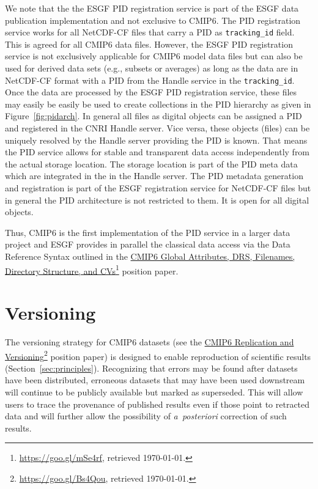 \documentclass[gmd,manuscript]{copernicus}
\newcommand{\pllabel}[1]{\label{p-#1}\linelabel{l-#1}}
\newcommand{\urlref}[2] {\href{#1}{#2}\footnote{\url{#1}, retrieved \today.}}
\begin{document}
\pllabel{RC1-57}
We note that the the ESGF PID registration service is part of the ESGF
data publication implementation and not exclusive to CMIP6. The PID
registration service works for all NetCDF-CF files that carry a PID
as \texttt{tracking\_id} field. This is agreed for all CMIP6 data
files. However, the ESGF PID registration service is not exclusively
applicable for CMIP6 model data files but can also be used for derived data
sets (e.g., subsets or averages) as long as the data are in
NetCDF-CF format with a PID from the Handle service in the
\texttt{tracking\_id}. Once the data are processed by the ESGF PID
registration service, these files may easily be easily be used to
create collections in the PID hierarchy as given in
Figure~\ref{fig:pidarch}. In general all files as digital objects can
be assigned a PID and registered in the CNRI Handle server. Vice
versa, these objects (files) can be uniquely resolved by the Handle
server providing the PID is known. That means the PID service allows
for stable and transparent data access independently from the actual
storage location. The storage location is part of the PID meta data
which are integrated in the in the Handle server. The PID metadata
generation and registration is part of the ESGF registration service
for NetCDF-CF files but in general the PID architecture is not
restricted to them. It is open for all digital objects.

Thus, CMIP6 is the first implementation of the PID service in a larger
data project and ESGF provides in parallel the classical data access
via the Data Reference Syntax outlined in the
\urlref{https://goo.gl/mSe4rf}{CMIP6 Global Attributes, DRS,
  Filenames, Directory Structure, and CVs} position paper.

\section{Versioning}
\label{sec:version}

The versioning strategy for CMIP6 datasets (see the \urlref{https://goo.gl/Bs4Qou}{CMIP6
  Replication and Versioning} position paper) is designed to enable
reproduction of scientific results  (Section~\ref{sec:principles}).
Recognizing that errors may be found after datasets
have been distributed, erroneous datasets that may have been used
downstream will continue to be publicly available but marked as
superseded. This will allow users to trace the provenance of published
results even if those point to retracted data and will further allow the
possibility of \emph{a~posteriori} correction of such results.
\end{document}
